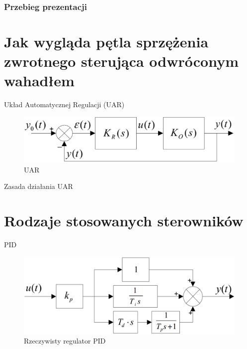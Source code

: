 



\frame{\titlepage}

\begin{frame}
  \frametitle{Przebieg prezentacji}
  \tableofcontents
\end{frame}



\section{Jak wygląda pętla sprzężenia zwrotnego 
    sterująca odwróconym wahadłem}
    
    \begin{frame}{Układ Automatycznej Regulacji (UAR)}
    	\begin{figure}[!htp]
    		\centering
    		\includegraphics[width=\textwidth]{img/uar}
    		\caption{UAR}
    	\end{figure}
    \end{frame}
    
    \begin{frame}{Zasada działania UAR}
    \end{frame}
    
\section{Rodzaje stosowanych sterowników}
	\begin{frame}{PID}
    	\begin{figure}[!htp]
    		\centering
    		\includegraphics[width=\textwidth]{img/pid_real}
    		\caption{Rzeczywisty regulator PID}
    	\end{figure}
	\end{frame}
	
